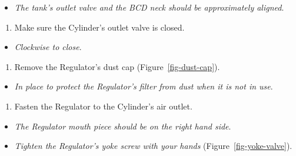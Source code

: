 \documentclass[
  12pt,
]{report}
\providecommand{\tightlist}{%
  \setlength{\itemsep}{0pt}\setlength{\parskip}{0pt}}\usepackage{longtable,booktabs,array}
\begin{document}
\begin{itemize}
\tightlist
\item
  \emph{The tank's outlet valve and the BCD neck should be approximately
  aligned}.
\end{itemize}

\begin{enumerate}
\def\labelenumi{\arabic{enumi}.}
\setcounter{enumi}{3}
\tightlist
\item
  Make sure the Cylinder's outlet valve is closed.
\end{enumerate}

\begin{itemize}
\tightlist
\item
  \emph{Clockwise to close}.
\end{itemize}

\begin{enumerate}
\def\labelenumi{\arabic{enumi}.}
\setcounter{enumi}{4}
\tightlist
\item
  Remove the Regulator's dust cap (Figure~\ref{fig-dust-cap}).
\end{enumerate}

\begin{itemize}
\tightlist
\item
  \emph{In place to protect the Regulator's filter from dust when it is
  not in use}.
\end{itemize}

\begin{enumerate}
\def\labelenumi{\arabic{enumi}.}
\setcounter{enumi}{5}
\tightlist
\item
  Fasten the Regulator to the Cylinder's air outlet.
\end{enumerate}

\begin{itemize}
\tightlist
\item
  \emph{The Regulator mouth piece should be on the right hand side}.
\item
  \emph{Tighten the Regulator's yoke screw with your hands}
  (Figure~\ref{fig-yoke-valve}).
\end{itemize}
\end{document}
